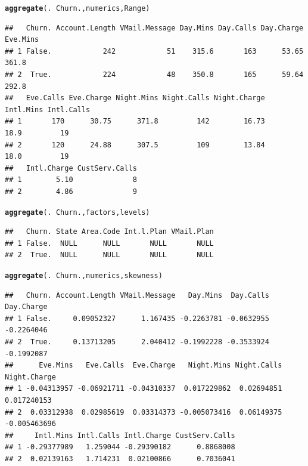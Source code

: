 \documentclass{article}\usepackage[]{graphicx}\usepackage[]{color}
\makeatletter
\newcommand{\hlopt}[1]{\textcolor[rgb]{0,0,0}{#1}}%
\newcommand{\hlstd}[1]{\textcolor[rgb]{0.345,0.345,0.345}{#1}}%
\newcommand{\hlkwd}[1]{\textcolor[rgb]{0.737,0.353,0.396}{\textbf{#1}}}%
\newenvironment{kframe}{%
 \def\at@end@of@kframe{}%
 \ifinner\ifhmode%
  \def\at@end@of@kframe{\end{minipage}}%
  \begin{minipage}{\columnwidth}%
 \fi\fi%
 \def\FrameCommand##1{\hskip\@totalleftmargin \hskip-\fboxsep
 \colorbox{shadecolor}{##1}\hskip-\fboxsep
     \hskip-\linewidth \hskip-\@totalleftmargin \hskip\columnwidth}%
 \MakeFramed {\advance\hsize-\width
   \@totalleftmargin\z@ \linewidth\hsize
   \@setminipage}}%
 {\par\unskip\endMakeFramed%
 \at@end@of@kframe}
\newenvironment{knitrout}{}{} %
\makeatother
\begin{document}
\begin{description}
\begin{knitrout}
\color{fgcolor}\begin{kframe}
\begin{alltt}
\hlkwd{aggregate}\hlstd{(.} \hlopt{~} \hlstd{Churn., numerics, Range)}
\end{alltt}
\begin{verbatim}
##   Churn. Account.Length VMail.Message Day.Mins Day.Calls Day.Charge Eve.Mins
## 1 False.            242            51    315.6       163      53.65    361.8
## 2  True.            224            48    350.8       165      59.64    292.8
##   Eve.Calls Eve.Charge Night.Mins Night.Calls Night.Charge Intl.Mins Intl.Calls
## 1       170      30.75      371.8         142        16.73      18.9         19
## 2       120      24.88      307.5         109        13.84      18.0         19
##   Intl.Charge CustServ.Calls
## 1        5.10              8
## 2        4.86              9
\end{verbatim}
\end{kframe}
\end{knitrout}

\begin{knitrout}
\color{fgcolor}\begin{kframe}
\begin{alltt}
\hlkwd{aggregate}\hlstd{(.} \hlopt{~} \hlstd{Churn., factors, levels)}
\end{alltt}
\begin{verbatim}
##   Churn. State Area.Code Int.l.Plan VMail.Plan
## 1 False.  NULL      NULL       NULL       NULL
## 2  True.  NULL      NULL       NULL       NULL
\end{verbatim}
\end{kframe}
\end{knitrout}

\begin{knitrout}
\color{fgcolor}\begin{kframe}
\begin{alltt}
\hlkwd{aggregate}\hlstd{(.} \hlopt{~} \hlstd{Churn., numerics, skewness)}
\end{alltt}
\begin{verbatim}
##   Churn. Account.Length VMail.Message   Day.Mins  Day.Calls Day.Charge
## 1 False.     0.09052327      1.167435 -0.2263781 -0.0632955 -0.2264046
## 2  True.     0.13713205      2.040412 -0.1992228 -0.3533924 -0.1992087
##      Eve.Mins   Eve.Calls  Eve.Charge   Night.Mins Night.Calls Night.Charge
## 1 -0.04313957 -0.06921711 -0.04310337  0.017229862  0.02694851  0.017240153
## 2  0.03312938  0.02985619  0.03314373 -0.005073416  0.06149375 -0.005463696
##     Intl.Mins Intl.Calls Intl.Charge CustServ.Calls
## 1 -0.29377989   1.259044 -0.29390182      0.8868008
## 2  0.02139163   1.714231  0.02100866      0.7036041
\end{verbatim}
\end{kframe}
\end{knitrout}


\end{description}
\end{document}
